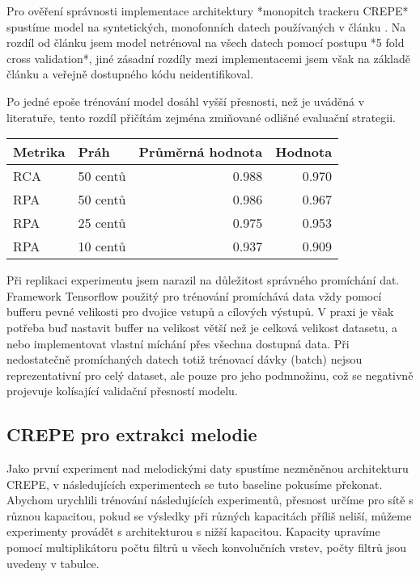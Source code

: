 Pro ověření správnosti implementace architektury *monopitch trackeru CREPE* spustíme model na syntetických, monofonních datech používaných v článku \cite{Salamon2017}. Na rozdíl od článku \cite{Kim2018} jsem model netrénoval na všech datech pomocí postupu *5 fold cross validation*, jiné zásadní rozdíly mezi implementacemi jsem však na základě článku a veřejně dostupného kódu neidentifikoval.

Po jedné epoše trénování model dosáhl vyšší přesnosti, než je uváděná v literatuře, tento rozdíl přičítám zejména zmiňované odlišné evaluační strategii.

    \begin{tabular}{llrr}
    \toprule
    Metrika & Práh & Průměrná hodnota & Hodnota \cite{Kim2018} \\
    \midrule
    RCA & 50 centů & 0.988 & 0.970 \\
    RPA  & 50 centů & 0.986 & 0.967 \\
    RPA  & 25 centů & 0.975 & 0.953 \\
    RPA  & 10 centů & 0.937 & 0.909 \\
    \bottomrule
    \end{tabular}

Při replikaci experimentu jsem narazil na důležitost správného promíchání dat. Framework Tensorflow použitý pro trénování promíchává data vždy pomocí bufferu pevné velikosti pro dvojice vstupů a cílových výstupů. V praxi je však potřeba buď nastavit buffer na velikost větší než je celková velikost datasetu, a nebo implementovat vlastní míchání přes všechna dostupná data. Při nedostatečně promíchaných datech totiž trénovací dávky (batch) nejsou reprezentativní pro celý dataset, ale pouze pro jeho podmnožinu, což se negativně projevuje kolísající validační přesností modelu.

\subsection{CREPE pro extrakci melodie}

Jako první experiment nad melodickými daty spustíme nezměněnou architekturu CREPE, v následujících experimentech se tuto baseline pokusíme překonat. Abychom urychlili trénování následujících experimentů, přesnost určíme pro sítě s různou kapacitou, pokud se výsledky při různých kapacitách příliš neliší, můžeme experimenty provádět s architekturou s nižší kapacitou. Kapacity upravíme pomocí multiplikátoru počtu filtrů u všech konvolučních vrstev, počty filtrů jsou uvedeny v tabulce.


